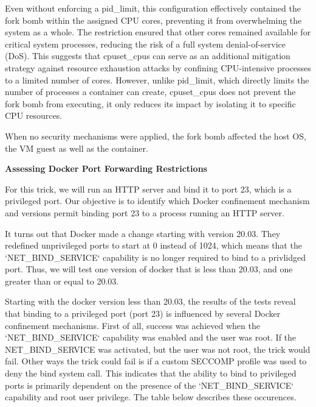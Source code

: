 Even without enforcing a pid\_limit, this configuration effectively contained the fork bomb within the assigned CPU cores, preventing it from overwhelming the system as a whole. The restriction ensured that other cores remained available for critical system processes, reducing the risk of a full system denial-of-service (DoS). This suggests that cpuset\_cpus can serve as an additional mitigation strategy against resource exhaustion attacks by confining CPU-intensive processes to a limited number of cores. However, unlike pid\_limit, which directly limits the number of processes a container can create, cpuset\_cpus does not prevent the fork bomb from executing, it only reduces its impact by isolating it to specific CPU resources.

When no security mechanisms were applied, the fork bomb affected the host OS, the VM guest as well as the container.

\noindent\textbf{Assessing Docker Port Forwarding Restrictions}

For this trick, we will run an HTTP server and bind it to port 23, which is a privileged port. Our objective is to identify which Docker confinement mechanism and versions permit binding port 23 to a process running an HTTP server.

It turns out that Docker made a change starting with version 20.03. They redefined unprivileged ports to start at 0 instead of 1024, which means that the `NET\_BIND\_SERVICE` capability is no longer required to bind to a privlidged port. Thus, we will test one version of docker that is less than 20.03, and one greater than or equal to 20.03.

Starting with the docker version less than 20.03, the results of the tests reveal that binding to a privileged port (port 23) is influenced by several Docker confinement mechanisms. First of all, success was achieved when the `NET\_BIND\_SERVICE` capability was enabled and the user was root. If the NET\_BIND\_SERVICE was activated, but the user was not root, the trick would fail. Other ways the trick could fail is if a custom SECCOMP profile was used to deny the bind system call. This indicates that the ability to bind to privileged ports is primarily dependent on the presence of the `NET\_BIND\_SERVICE` capability and root user privilege. The table below describes these occurences.

